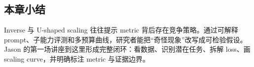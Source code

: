 
\subsection{本章小结}

Inverse 与 U-shaped scaling 往往提示 metric 背后存在竞争策略。通过可解释 prompt、子能力评测和多预算曲线，研究者能把“奇怪现象”改写成可检验假设。Jason 的第一场讲座到这里形成完整闭环：看数据、识别潜在任务、拆解 loss、画 scaling curve，并明确标注 metric 与证据边界。

